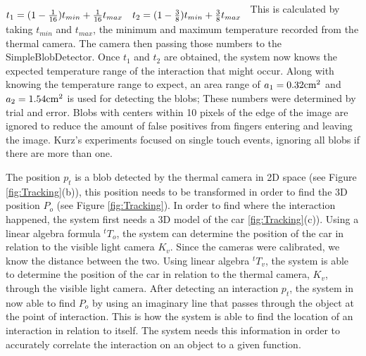 \documentclass{sig-alternate}
\begin{document}
\(
\begin{matrix} \\
 t_{1}=(1-{1\over 16})t_{ min}+{1\over 16}t_{ max} & t_{2}=(1-{3\over 8})t_{ min}+{3\over 8}t_{ max}\cr 
 \end{matrix} \\\\
\)
This is calculated by taking \(t_{min}\) and \(t_{max}\), the minimum and maximum temperature recorded from the thermal camera. The camera then passing those numbers to the SimpleBlobDetector. Once \(t_1\) and \(t_2\) are obtained, the system now knows the expected temperature range of the interaction that might occur. Along with knowing the temperature range to expect, an area range of \(a_{1}=0.32{\rm cm}^{2}\) and \(a_{2}=1.54{\rm cm}^{2}\) is used for detecting the blobs; These numbers were determined by trial and error. Blobs with centers within 10 pixels of the edge of the image are ignored to reduce the amount of false positives from fingers entering and leaving the image. Kurz's experiments focused on single touch events, ignoring all blobs if there are more than one.

The position \(p_t\) is a blob detected by the thermal camera in 2D space (see Figure \ref{fig:Tracking}(b)), this position needs to be transformed in order to find the 3D position \(P_o\) (see Figure \ref{fig:Tracking}). In order to find where the interaction happened, the system first needs a 3D model of the car \ref{fig:Tracking}(c)). Using a linear algebra formula \({^t}T_o\), the system can determine the position of the car in relation to the visible light camera \(K_v\). Since the cameras were calibrated, we know the distance between the two. Using linear algebra \({^t}T_v\), the system is able to determine the position of the car in relation to the thermal camera, \(K_v\), through the visible light camera. After detecting an interaction \(p_t\), the system in now able to find \(P_o\) by using an imaginary line that passes through the object at the point of interaction. This is how the system is able to find the location of an interaction in relation to itself. The system needs this information in order to accurately correlate the interaction on an object to a given function.    
 
\end{document}
